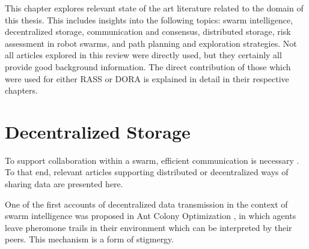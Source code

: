 \label{sec:RevLitt}
This chapter explores relevant state of the art literature related to the domain of this thesis. This includes insights into the following topics: swarm intelligence, decentralized storage, communication and consensus, distributed storage, risk assessment in robot swarms, and path planning and exploration strategies. Not all articles explored in this review were directly used, but they certainly all provide good background information. The direct contribution of those which were used for either \ac{RASS} or \ac{DORA} is explained in detail in their respective chapters.

\section{Decentralized Storage}
To support collaboration within a swarm, efficient communication is necessary \cite{dutta2020efficient}. To that end, relevant articles supporting distributed or decentralized ways of sharing data are presented here.

One of the first accounts of decentralized data transmission in the context of swarm intelligence was proposed in Ant Colony Optimization \cite{dorigo2006ant}, in which agents leave pheromone trails in their environment which can be interpreted by their peers. This mechanism is a form of stigmergy.

